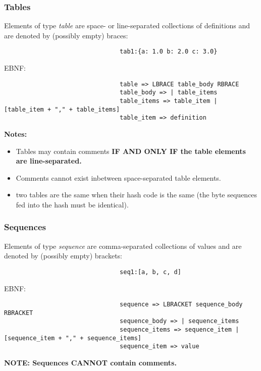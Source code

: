\documentclass{article}
\begin{document}
                \subsubsection{Tables}
                        Elements of type \emph{table} 
                        are space- or line-separated collections of definitions 
                        and are denoted by (possibly empty) braces:
                        \begin{verbatim}
                                tab1:{a: 1.0 b: 2.0 c: 3.0}
                        \end{verbatim}
                        \vspace{1mm}
                        EBNF:
                        \begin{verbatim}
                                table => LBRACE table_body RBRACE
                                table_body => | table_items
                                table_items => table_item | [table_item + "," + table_items]
                                table_item => definition
                        \end{verbatim}
                        \par
                        \bf Notes:\rm
                        \begin{itemize}
                                \item Tables may contain comments \bf IF AND ONLY IF \rm 
                                                the table elements are line-separated. 
                                \item Comments cannot exist inbetween space-separated table elements.
                                \item two tables are the same when their hash code is the same 
                                                (the byte sequences fed into the hash must be identical).
                        \end{itemize}
                \subsubsection{Sequences}
                        Elements of type \emph{sequence} 
                        are comma-separated collections of values 
                        and are denoted by (possibly empty) brackets:
                        \begin{verbatim}
                                seq1:[a, b, c, d]
                        \end{verbatim}
                        \vspace{1mm}
                        EBNF:
                        \begin{verbatim}
                                sequence => LBRACKET sequence_body RBRACKET
                                sequence_body => | sequence_items
                                sequence_items => sequence_item | [sequence_item + "," + sequence_items]
                                sequence_item => value
                        \end{verbatim}
                        \par
                        \bf NOTE: \rm Sequences \bf CANNOT \rm contain comments.
\end{document}
